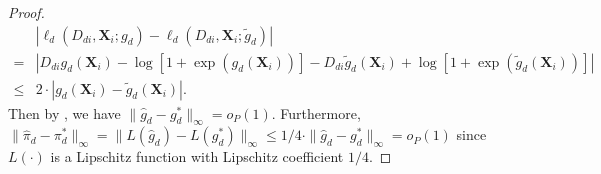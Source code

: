 \documentclass[11pt]{article}
\numberwithin{equation}{section}
\begin{document}
{\begin{proof}
		\begin{align*}
			&|\ell_d(D_{di},\boldsymbol{X}_{i};g_d)-\ell_d(D_{di},\boldsymbol{X}_{i};\widetilde{g}_d)|\\
			=&\left|D_{di}g_d(\boldsymbol{X}_i)-\log\left[1+\exp(g_d(\boldsymbol{X}_i))\right]-D_{di}\widetilde{g}_d(\boldsymbol{X}_i)+\log\left[1+\exp(\widetilde{g}_d(\boldsymbol{X}_i))\right]\right|\\
			\leq & 2\cdot |g_d(\boldsymbol{X}_{i})-\widetilde{g}_d(\boldsymbol{X}_{i})|.
		\end{align*}
		Then by  \citet[Theorem 3.1]{chen2007large}, we have $\|\widehat{g}_d-g_d^*\|_{\infty}=o_P(1)$. Furthermore, $\|\widehat{\pi}_d-\pi_d^*\|_{\infty}=\|L(\widehat{g}_d)-L(g_d^*)\|_{\infty}\leq 1/4\cdot \|\widehat{g}_d-g_d^*\|_{\infty}=o_P(1)$ since $L(\cdot)$ is a Lipschitz function with Lipschitz coefficient $1/4$.
\end{proof}}

\clearpage
\end{document}
